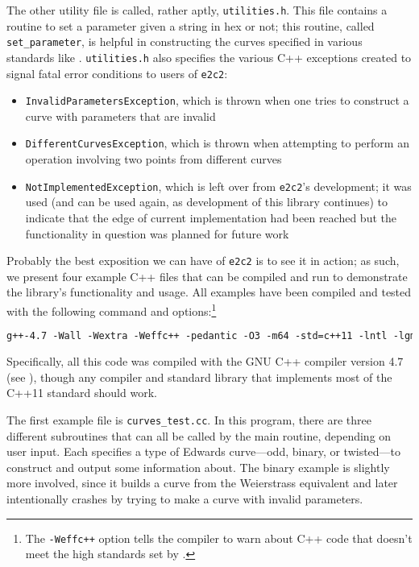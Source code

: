 
The other utility file is called, rather aptly, \texttt{utilities.h}.
This file contains a routine to set a parameter given a string in hex or not;
    this routine, called \texttt{set\_parameter}, is helpful in constructing
    the curves specified in various standards like \cite{gallagher09fipspub}.
\texttt{utilities.h} also specifies the various C++ exceptions created to
    signal fatal error conditions to users of \texttt{e2c2}:
\begin{itemize}
\item \texttt{InvalidParametersException}, which is thrown when one tries to
    construct a curve with parameters that are invalid
\item \texttt{DifferentCurvesException}, which is thrown when attempting to
    perform an operation involving two points from different curves
\item \texttt{NotImplementedException}, which is left over from \texttt{e2c2}'s
    development; it was used (and can be used again, as development of this
    library continues) to indicate that the edge of current implementation had
    been reached but the functionality in question was planned for future work
\end{itemize}


Probably the best exposition we can have of \texttt{e2c2} is to see it in
    action; as such, we present four example C++ files that can be compiled
    and run to demonstrate the library's functionality and usage.
All examples have been compiled and tested with the following command and
    options:\footnote{The \texttt{-Weffc++} option tells the compiler to warn
    about C++ code that doesn't meet the high standards set by
    \cite{meyers2005effective}.}
\begin{lstlisting}[caption={Compiler Options},language=HTML]
g++-4.7 -Wall -Wextra -Weffc++ -pedantic -O3 -m64 -std=c++11 -lntl -lgmp
\end{lstlisting}
Specifically, all this code was compiled with the GNU C++ compiler version 4.7
    (see \cite{stallman2002gnu}), though any compiler and standard library that
    implements most of the C++11 standard should work.


The first example file is \texttt{curves\_test.cc}.
In this program, there are three different subroutines that can all be called
    by the main routine, depending on user input.
Each specifies a type of Edwards curve---odd, binary, or twisted---to construct
    and output some information about.
The binary example is slightly more involved, since it builds a curve from the
    Weierstrass equivalent and later intentionally crashes by trying to make a
    curve with invalid parameters.

